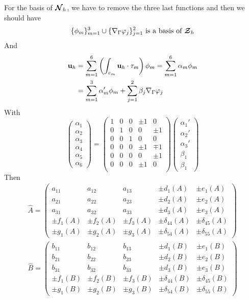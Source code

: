For the basis of ${\bm{\mathcal{N}}}_h$, we have to remove the three last functions and then we
should have \[ \{\phi_m\}_{m=1}^3\cup\{{\nabla}_\Gamma\varphi_j\}_{j=1}^2 \mbox{ is
  a basis of } {\bm{\mathcal{Z}}}_h \]
And
\begin{align*}
{\mathbf{u}}_h &= \sum_{m=1}^6 \left(\int_{e_m} {\mathbf{u}}_h\cdot\tau_m\right) \phi_m = \sum_{m=1}^6 \alpha_m \phi_m\\
&= \sum_{m=1}^3 \alpha_m'\phi_m + \sum_{j=1}^2 \beta_j{\nabla}_\Gamma\varphi_j
\end{align*}
With
\[ \begin{pmatrix}
\alpha_1\\\alpha_2\\\alpha_3\\\alpha_4\\\alpha_5\\\alpha_6
\end{pmatrix} = \begin{pmatrix}
1 & 0 & 0 & \pm 1 & 0\\
0 & 1 & 0 & 0 & \pm 1\\
0 & 0 & 1 & 0 & 0\\
0 & 0 & 0 & \pm 1 & \mp 1\\
0 & 0 & 0 & 0 & \pm 1\\
0 & 0 & 0 & \pm 1 & 0\\
\end{pmatrix} \begin{pmatrix}
\alpha_1'\\\alpha_2'\\\alpha_3'\\\beta_1\\\beta_1
\end{pmatrix} \]
Then
\begin{align*} \widehat{A}=\begin{pmatrix}
a_{11} & a_{12} & a_{13} & \pm d_1(A) & \pm e_1(A)\\
a_{21} & a_{22} & a_{23} & \pm d_2(A) & \pm e_2(A)\\
a_{31} & a_{32} & a_{33} & \pm d_3(A) & \pm e_3(A)\\
\pm f_1(A) & \pm f_2(A) & \pm f_3(A) & \pm \delta_{44}(A) & \pm \delta_{45}(A)\\
\pm g_1(A) & \pm g_2(A) & \pm g_3(A) & \pm \delta_{54}(A) & \pm \delta_{55}(A)
\end{pmatrix}\\
\widehat{B}=\begin{pmatrix}
b_{11} & b_{12} & b_{13} & \pm d_1(B) & \pm e_1(B)\\
b_{21} & b_{22} & b_{23} & \pm d_2(B) & \pm e_2(B)\\
b_{31} & b_{32} & b_{33} & \pm d_3(B) & \pm e_3(B)\\
\pm f_1(B) & \pm f_2(B) & \pm f_3(B) & \pm \delta_{44}(B) & \pm \delta_{45}(B)\\
\pm g_1(B) & \pm g_2(B) & \pm g_3(B) & \pm \delta_{54}(B) & \pm \delta_{55}(B)
\end{pmatrix}
\end{align*}
